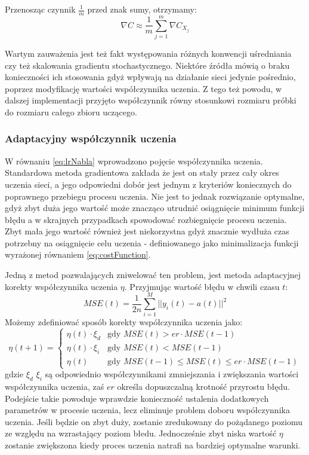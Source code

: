 \documentclass[12pt,twoside]{article}
\begin{document}
Przenosząc czynnik $\frac{1}{m}$ przed znak sumy, otrzymamy:
\begin{equation}
	\label{eq:stochasticGradientFinal}
	\nabla C \approx \frac{1}{m} \sum_{j=1}^{m} \nabla C_{X_j}
\end{equation}

Wartym zauważenia jest też fakt występowania różnych konwencji uśredniania czy też skalowania gradientu stochastycznego. \cite{nndl}
Niektóre źródła mówią o braku konieczności ich stosowania gdyż wpływają na działanie sieci jedynie pośrednio, poprzez modyfikację wartości współczynnika uczenia.
Z tego też powodu, w dalszej implementacji przyjęto współczynnik równy stosunkowi rozmiaru próbki do rozmiaru całego zbioru uczącego.

\subsubsection{Adaptacyjny współczynnik uczenia}
W równaniu \ref{eq:lrNabla} wprowadzono pojęcie współczynnika uczenia.
Standardowa metoda gradientowa zakłada że jest on stały przez cały okres uczenia sieci, a jego odpowiedni dobór jest jednym z kryteriów koniecznych do poprawnego przebiegu procesu uczenia.
Nie jest to jednak rozwiązanie optymalne, gdyż zbyt duża jego wartość może znacząco utrudnić osiągnięcie minimum funkcji błędu a w skrajnych przypadkach spowodować rozbiegnięcie procesu uczenia.
Zbyt mała jego wartość również jest niekorzystna gdyż znacznie wydłuża czas potrzebny na osiągnięcie celu uczenia - definiowanego jako minimalizacja funkcji wyrażonej równaniem \ref{eq:costFunction}.

Jedną z metod pozwalających zniwelować ten problem, jest metoda adaptacyjnej korekty współczynnika uczenia $\eta $\cite{kiaAcc}.
Przyjmując wartość błędu w chwili czasu $t$:
\begin{equation}
	\label{eq:costFunctionTimed}
	MSE(t) = \frac{1}{2n} \sum_{i=1}^{M}  || y_{i}(t) - a(t) ||^2
\end{equation}
Możemy zdefiniować sposób korekty współczynnika uczenia jako:
\begin{equation}
	\label{eq:adaptiveLR}
	\eta \left( t + 1 \right)  =
	\begin{cases}
		\eta \left( t \right) \cdot \xi_d & \text{gdy } MSE(t) > er \cdot MSE(t-1)\\
		\eta \left( t \right) \cdot \xi_i & \text{gdy } MSE(t) <  MSE(t-1)\\
		\eta \left( t \right)  & \text{gdy } MSE(t-1) \leq MSE(t) \leq er \cdot MSE(t-1)
	\end{cases}
\end{equation}
gdzie $\xi_d$ $\xi_i$ są odpowiednio współczynnikami zmniejszania i zwiększania wartości współczynnika uczenia, zaś $er$ określa dopuszczalną krotność przyrostu błędu.
Podejście takie powoduje wprawdzie konieczność ustalenia dodatkowych parametrów w procesie uczenia, lecz eliminuje problem doboru współczynnika uczenia.
Jeśli będzie on zbyt duży, zostanie zredukowany do pożądanego poziomu ze względu na wzrastający poziom błedu.
Jednocześnie zbyt niska wartość $\eta$ zostanie zwiększona kiedy proces uczenia natrafi na bardziej optymalne warunki.
\end{document}
